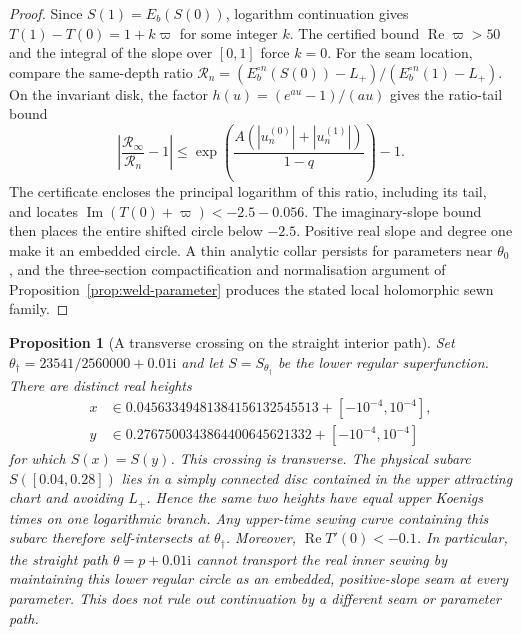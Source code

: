 \documentclass[11pt,a4paper]{article}
\newtheorem{proposition}[theorem]{Proposition}
\theoremstyle{definition}
\newcommand{\ii}{\mathrm{i}}
\begin{document}
\begin{proof}
Since $S(1)=E_b(S(0))$, logarithm continuation gives
$T(1)-T(0)=1+k\varpi$ for some integer $k$.  The certified
bound $\operatorname{Re}\varpi>50$ and the integral of the slope
over $[0,1]$ force $k=0$.  For the seam location, compare the
same-depth ratio
$\mathcal R_n=(E_b^{\circ n}(S(0))-L_+)/
(E_b^{\circ n}(1)-L_+)$.  On the invariant disk, the factor
$h(u)=(e^{au}-1)/(au)$ gives the ratio-tail bound
\[
 \left|\frac{\mathcal R_\infty}{\mathcal R_n}-1\right|
 \le \exp\!\left(
 \frac{A(|u_n^{(0)}|+|u_n^{(1)}|)}{1-q}\right)-1.
\]
The certificate encloses the principal logarithm of this ratio,
including its tail, and locates
$\operatorname{Im}(T(0)+\varpi)<-2.5-0.056$.
The imaginary-slope bound then places the entire shifted circle
below $-2.5$.  Positive real slope and degree one make it an
embedded circle.  A thin analytic collar persists for parameters
near $\theta_0$, and the three-section compactification and
normalisation argument of Proposition~\ref{prop:weld-parameter}
produces the stated local holomorphic sewn family.
\end{proof}

\begin{proposition}[A transverse crossing on the straight interior path]
\label{prop:interior-path-crossing}
Set
$\theta_\dagger=23541/2560000+0.01\ii$ and let
$S=S_{\theta_\dagger}$ be the lower regular superfunction.
There are distinct real heights
\[
\begin{aligned}
x&\in 0.04563349481384156132545513+[-10^{-4},10^{-4}],\\
y&\in 0.2767500343864400645621332+[-10^{-4},10^{-4}]
\end{aligned}
\]
for which $S(x)=S(y)$.  This crossing is transverse.  The physical
subarc $S([0.04,0.28])$ lies in a simply connected disc contained in
the upper attracting chart and avoiding $L_+$.  Hence the same two
heights have equal upper Koenigs times on one logarithmic branch.
Any upper-time sewing curve containing this subarc therefore
self-intersects at $\theta_\dagger$.  Moreover,
$\operatorname{Re}T'(0)<-0.1$.  In particular, the straight path
$\theta=p+0.01\ii$ cannot transport the real inner sewing by
maintaining this lower regular circle as an embedded, positive-slope
seam at every parameter.  This does not rule out continuation by a
different seam or parameter path.
\end{proposition}
\end{document}
